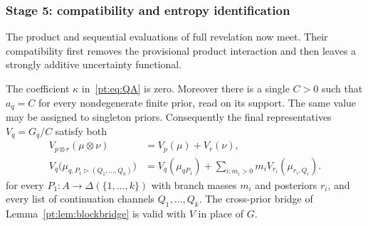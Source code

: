 \subsubsection{Stage 5: compatibility and entropy identification}

The product and sequential evaluations of full revelation now meet.  Their
compatibility first removes the provisional product interaction and then
leaves a strongly additive uncertainty functional.

\begin{lemma}
\label{pt:lem:scalecoherence}
The coefficient $\kappa$ in~\eqref{pt:eq:QA} is zero.  Moreover there is a
single $C>0$ such that $a_q=C$ for every nondegenerate finite prior, read on
its support.  The same value may be assigned to singleton priors.
Consequently the final representatives $V_q=G_q/C$ satisfy both
\begin{align}
 V_{p\otimes r}(\mu\otimes\nu)
   &=V_p(\mu)+V_r(\nu),\tag{PA}\label{pt:eq:PArecovered}\\
 V_q\bigl(\mu_{q,P_1\triangleright(Q_1,\ldots,Q_k)}\bigr)
   &=V_q(\mu_{qP_1})+\sum_{i:m_i>0}m_i
     V_{r_i}(\mu_{r_i,Q_i}).\tag{CR$'$}\label{pt:eq:final-chain}
\end{align}
for every $P_1:A\to\Delta(\{1,\ldots,k\})$ with branch masses $m_i$ and posteriors $r_i$, and every list of
continuation channels $Q_1,\ldots,Q_k$.
The cross-prior bridge of Lemma~\ref{pt:lem:blockbridge} is valid with $V$
in place of $G$.
\end{lemma}

